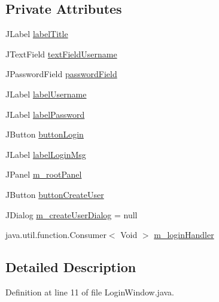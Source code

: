 \subsection*{Private Attributes}
\begin{DoxyCompactItemize}
\item 
J\+Label \mbox{\hyperlink{classcom_1_1activitytracker_1_1_login_window_a3c4c84a656351094b34320a5c352e685}{label\+Title}}
\item 
J\+Text\+Field \mbox{\hyperlink{classcom_1_1activitytracker_1_1_login_window_aba181dcec114c349a67304406bcce92a}{text\+Field\+Username}}
\item 
J\+Password\+Field \mbox{\hyperlink{classcom_1_1activitytracker_1_1_login_window_ae53353ceea197fe7b93f1b7156112d08}{password\+Field}}
\item 
J\+Label \mbox{\hyperlink{classcom_1_1activitytracker_1_1_login_window_a4999e1461716e42ee4e3de8e3eb47eb9}{label\+Username}}
\item 
J\+Label \mbox{\hyperlink{classcom_1_1activitytracker_1_1_login_window_a8be41422fca8038bd8c2ba49af8ae6ce}{label\+Password}}
\item 
J\+Button \mbox{\hyperlink{classcom_1_1activitytracker_1_1_login_window_ac77d9f8f3a6c697a9847ecd130ac2ef6}{button\+Login}}
\item 
J\+Label \mbox{\hyperlink{classcom_1_1activitytracker_1_1_login_window_a567ae49b39c07840b39eec92fdf92c22}{label\+Login\+Msg}}
\item 
J\+Panel \mbox{\hyperlink{classcom_1_1activitytracker_1_1_login_window_aa62049382baddb801cb25201814efc57}{m\+\_\+root\+Panel}}
\item 
J\+Button \mbox{\hyperlink{classcom_1_1activitytracker_1_1_login_window_a1ff77d6846d01d4a8540371ede091371}{button\+Create\+User}}
\item 
J\+Dialog \mbox{\hyperlink{classcom_1_1activitytracker_1_1_login_window_a49ff7093e29ce7bd22c42ac8099d5d34}{m\+\_\+create\+User\+Dialog}} = null
\item 
java.\+util.\+function.\+Consumer$<$ Void $>$ \mbox{\hyperlink{classcom_1_1activitytracker_1_1_login_window_aab28a8e6372499a8690d524dedeaf9e1}{m\+\_\+login\+Handler}}
\end{DoxyCompactItemize}


\subsection{Detailed Description}


Definition at line 11 of file Login\+Window.\+java.



